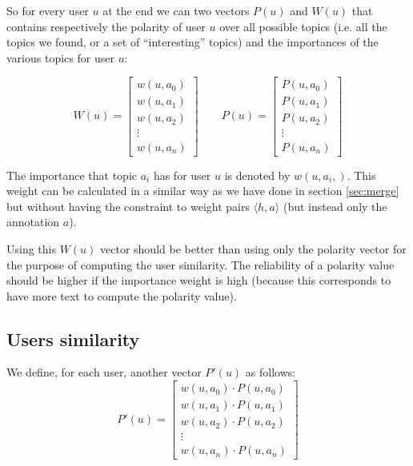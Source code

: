 \documentclass[a4paper,11pt,oneside]{article}
\begin{document}
So for every user $u$ at the end we can two vectors $P(u)$ and $W(u)$ that contains respectively the polarity of user $u$ over all possible topics (i.e. all the topics we found, or a set of ``interesting'' topics) and the importances of the various topics for user $u$:

\begin{equation}
W(u) = \left[  \begin{array}{c}
w(u,a_0) \\ 
w(u,a_1) \\ 
w(u,a_2) \\ 
\vdots \\ 
w(u,a_n)
\end{array}\right]\qquad
P(u) = \left[  \begin{array}{c}
P(u,a_0) \\ 
P(u,a_1) \\ 
P(u,a_2) \\ 
\vdots \\ 
P(u,a_n)
\end{array}\right]
\end{equation}

The importance that topic $a_i$ has for user $u$ is denoted by $w(u,a_i,)$. This weight can be calculated in a similar way as we have done in section \ref{sec:merge} but without having the constraint to weight pairs $\langle h,a \rangle$ (but instead only the annotation $a$).

Using this $W(u)$ vector should be better than using only the polarity vector for the purpose of computing the user similarity. The reliability of a polarity value should be higher if the importance weight is high (because this corresponds to have more text to compute the polarity value).

\subsection{Users similarity}
We define, for each user, another vector $P'(u)$ as follows:
\begin{equation}
P'(u) = \left[  \begin{array}{c}
w(u,a_0) \cdot P(u,a_0) \\ 
w(u,a_1)  \cdot P(u,a_1) \\ 
w(u,a_2)  \cdot P(u,a_2) \\ 
\vdots \\ 
w(u,a_n) \cdot P(u,a_n)
\end{array}\right]
\end{equation}
\end{document}
